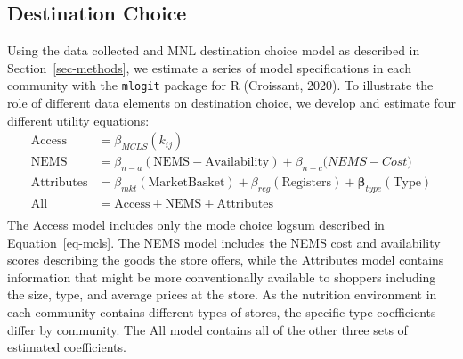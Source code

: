 \documentclass[
  letterpaper,
  number,
  review,
  3p]{elsarticle}
\begin{document}
\subsection{Destination Choice}\label{sec-estimation}

Using the data collected and MNL destination choice model as described
in Section~\ref{sec-methods}, we estimate a series of model
specifications in each community with the \texttt{mlogit} package for R
(Croissant, 2020). To illustrate the role of different data elements on
destination choice, we develop and estimate four different utility
equations: \begin{align*}
\mathrm{Access} &= \beta_{MCLS}( k_{ij})\\
\mathrm{NEMS} &= \beta_{n-a} (\mathrm{NEMS-Availability}) + \beta_{n-c}\mathrm({NEMS-Cost})\\
\mathrm{Attributes} &= \beta_{mkt} (\mathrm{Market Basket}) + \beta_{reg} (\mathrm{Registers}) + \mathbf{\beta}_{type}(\mathrm{Type})\\
\mathrm{All} &= \mathrm{Access} + \mathrm{NEMS} + \mathrm{Attributes}\\
\end{align*} The Access model includes only the mode choice logsum
described in Equation~\ref{eq-mcls}. The NEMS model includes the NEMS
cost and availability scores describing the goods the store offers,
while the Attributes model contains information that might be more
conventionally available to shoppers including the size, type, and
average prices at the store. As the nutrition environment in each
community contains different types of stores, the specific type
coefficients differ by community. The All model contains all of the
other three sets of estimated coefficients.
\end{document}
